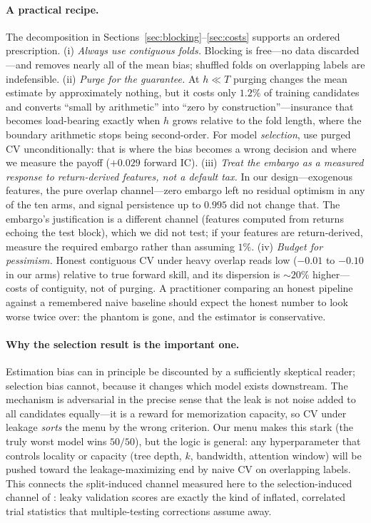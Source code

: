 \documentclass[11pt]{article}
\begin{document}
\paragraph{A practical recipe.} The decomposition in
Sections~\ref{sec:blocking}--\ref{sec:costs} supports an ordered
prescription. (i) \emph{Always use contiguous folds.} Blocking is free---no
data discarded---and removes nearly all of the mean bias; shuffled folds on
overlapping labels are indefensible. (ii) \emph{Purge for the guarantee.}
At $h \ll T$ purging changes the mean estimate by approximately nothing,
but it costs only $1.2\%$ of training candidates and converts ``small by
arithmetic'' into ``zero by construction''---insurance that becomes load-bearing
exactly when $h$ grows relative to the fold length, where the boundary
arithmetic stops being second-order. For model \emph{selection}, use purged
CV unconditionally: that is where the bias becomes a wrong decision and
where we measure the payoff ($+0.029$ forward IC). (iii) \emph{Treat the
embargo as a measured response to return-derived features, not a default
tax.} In our design---exogenous features, the pure overlap channel---zero
embargo left no residual optimism in any of the ten arms, and signal persistence up to
$0.995$ did not change that. The embargo's justification is a different
channel (features computed from returns echoing the test block), which we
did not test; if your features are return-derived, measure the required
embargo rather than assuming $1\%$. (iv) \emph{Budget for pessimism.}
Honest contiguous CV under heavy overlap reads low ($-0.01$ to $-0.10$ in
our arms) relative to true forward skill, and its dispersion is ${\sim}20\%$
higher---costs of contiguity, not of purging. A practitioner comparing an
honest pipeline against a remembered naive baseline should expect the
honest number to look worse twice over: the phantom is gone, and the
estimator is conservative.

\paragraph{Why the selection result is the important one.} Estimation bias
can in principle be discounted by a sufficiently skeptical reader; selection
bias cannot, because it changes which model exists downstream. The
mechanism is adversarial in the precise sense that the leak is not noise
added to all candidates equally---it is a reward for memorization capacity,
so CV under leakage \emph{sorts} the menu by the wrong criterion. Our menu
makes this stark (the truly worst model wins $50/50$), but the logic is
general: any hyperparameter that controls locality or capacity (tree depth,
$k$, bandwidth, attention window) will be pushed toward the
leakage-maximizing end by naive CV on overlapping labels. This connects the
split-induced channel measured here to the selection-induced channel of
\citet{bailey2014pseudo,bailey2017probability}: leaky validation scores are
exactly the kind of inflated, correlated trial statistics that
multiple-testing corrections assume away.
\end{document}
